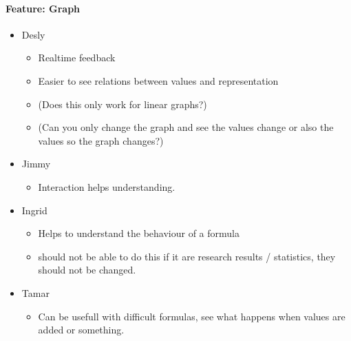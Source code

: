 \documentclass[main.tex]{subfiles}
\begin{document}
\paragraph{Feature: Graph}
\begin{itemize}
	\item Desly
		\begin{itemize}
			\item Realtime feedback
			\item Easier to see relations between values and representation
			\item (Does this only work for linear graphs?)
			\item (Can you only change the graph and see the values change or also the values so the graph changes?)
		\end{itemize}
	\item Jimmy
		\begin{itemize}
			\item Interaction helps understanding.
		\end{itemize}
	\item  Ingrid
		\begin{itemize}
			\item Helps to understand the behaviour of a formula
 			\item should not be able to do this if it are research results / statistics, they should not be changed. 
		\end{itemize}
	\item Tamar
		\begin{itemize}
			\item Can be usefull with difficult formulas, see what happens when values are added or something.
		\end{itemize}
\end{itemize}
\end{document}
